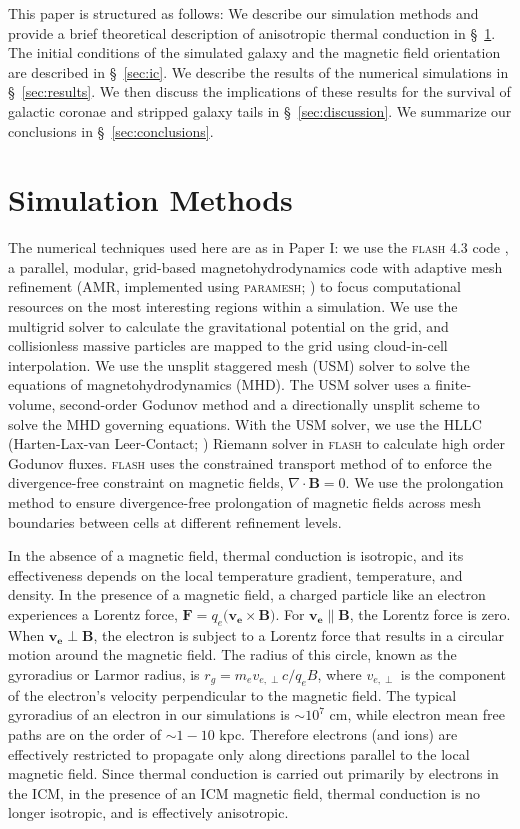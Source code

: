 \documentclass[twocolumn]{aastex6}
\newcommand{\flash}{{\normalfont\scshape flash }}
\newcommand{\paramesh}{{\normalfont\scshape paramesh}}
\begin{document}
This paper is structured as follows: We  describe our simulation methods and provide a brief theoretical description of anisotropic thermal conduction in \S~\ref{sec:methods}. The initial conditions of the simulated galaxy and the magnetic field orientation are described in \S~\ref{sec:ic}. We describe the results of the numerical simulations in \S~\ref{sec:results}. We then discuss the implications of these results for the survival of galactic coronae and stripped galaxy tails in \S~\ref{sec:discussion}. We summarize our conclusions in \S~\ref{sec:conclusions}.

\section{Simulation Methods} 
\label{sec:methods}
The numerical techniques used here are as in Paper I: we use the \flash 4.3 code \citep{Fryxell00, Dubey08}, a parallel, modular, grid-based magnetohydrodynamics code with adaptive mesh refinement (AMR, implemented using \paramesh; \citealt{MacNeice00}) to focus computational resources on the most interesting regions within a simulation. We use the multigrid solver \citep{Ricker08} to calculate the gravitational potential on the grid, and collisionless massive particles are mapped to the grid using cloud-in-cell interpolation. We use the unsplit staggered mesh (USM) solver \citep{Lee09, Lee13} to solve the equations of magnetohydrodynamics (MHD).  The USM solver uses a finite-volume, second-order Godunov method and a directionally unsplit scheme to solve the MHD governing equations. With the USM solver, we use the HLLC (Harten-Lax-van Leer-Contact; \citealt{Toro94, Li05}) Riemann solver  in \flash to calculate high order Godunov fluxes. \flash uses the constrained transport method of \citet{Evans88} to enforce the divergence-free constraint on magnetic fields, $\nabla \cdot \mathbf{B} = 0$. We use the \citet{Balsara01} prolongation method to ensure divergence-free prolongation of magnetic fields across mesh boundaries between cells at different refinement levels. 

In the absence of a magnetic field, thermal conduction is isotropic, and its  effectiveness depends on the local temperature gradient, temperature, and density. In the presence of a magnetic field, a charged particle like an electron experiences a Lorentz force, $\mathbf{F} = q_e (\mathbf{v_e} \times \mathbf{B)}$. For $\mathbf{v_e} \parallel \mathbf{B}$, the Lorentz force is zero. When $\mathbf{v_e} \perp \mathbf{B}$, the electron is subject to a Lorentz force that results in a circular motion around the magnetic field. The radius of this circle, known as the gyroradius or Larmor radius, is $r_g = m_e v_{e, \perp} c / q_e B $, where $v_{e, \perp}$  is the component of the electron's velocity perpendicular to the magnetic field. The typical gyroradius of an electron in our simulations is $\sim 10^7$ cm, while electron mean free paths are on the order of $\sim 1 - 10$ kpc. Therefore electrons (and ions) are effectively restricted to propagate only along directions parallel to the local magnetic field. Since thermal  conduction is carried out primarily by electrons in the ICM, in the presence of an ICM magnetic field, thermal conduction is no longer isotropic, and is effectively anisotropic.
\end{document}
